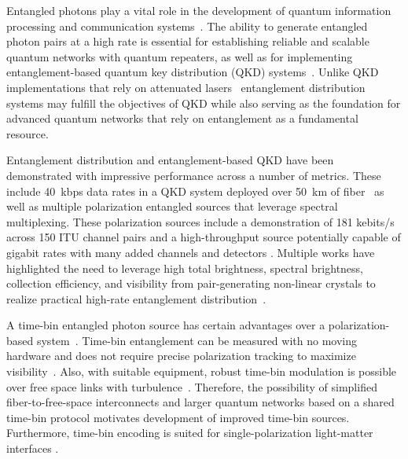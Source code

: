 \documentclass[11pt]{caltech_thesis} %
\begin{document}
Entangled photons play a vital role in the development of quantum information processing and communication systems~\autocite{nielsen2010quantum,ladd2010quantum,gisin2007quantum,pirandola2015advances,briegel1998quantum,kimble2008quantum}. The ability to generate entangled photon pairs at a high rate is essential for establishing reliable and scalable quantum networks with quantum repeaters, as well as for implementing entanglement-based quantum key distribution (QKD) systems~\autocite{Sangouard2011,ma2007quantum,ribordy2000long,yin2017satellite}. Unlike QKD implementations that rely on attenuated lasers~\autocite{sasaki2011field,scarani2009security} entanglement distribution systems may fulfill the objectives of QKD while also serving as the foundation for advanced quantum networks that rely on entanglement as a fundamental resource.

Entanglement distribution and entanglement-based QKD have been demonstrated with impressive performance across a number of metrics. These include 40~kbps data rates in a QKD system deployed over 50~km of fiber~\autocite{Pelet2022} as well as multiple polarization entangled sources that leverage spectral multiplexing. These polarization sources include a demonstration of 181 kebits/s across 150 ITU channel pairs and a high-throughput source potentially capable of gigabit rates with many added channels and detectors \autocite{Alshowkan2022,Neumann2022Entanglement}. Multiple works have highlighted the need to leverage high total brightness, spectral brightness, collection efficiency, and visibility from pair-generating non-linear crystals to realize practical high-rate entanglement distribution~\autocite{Neumann2022Entanglement,atzeni2018integrated,sun2019compact,liu2021device,kaiser2014polarization,anwar2021entangled,neumann2021model}.

A time-bin entangled photon source has certain advantages over a polarization-based system~\autocite{marcikic2002time}. Time-bin entanglement can be measured with no moving hardware and does not require precise polarization tracking to maximize visibility~\autocite{Dong2018PolarizationControll,Fitzke2022TimeBinVsPol}. Also, with suitable equipment, robust time-bin modulation is possible over free space links with turbulence~\autocite{Jin2019}. Therefore, the possibility of simplified fiber-to-free-space interconnects and larger quantum networks based on a shared time-bin protocol motivates development of improved time-bin sources. Furthermore, time-bin encoding is suited for single-polarization light-matter interfaces \autocite[\textcite{lauk2020perspectives}]{simon2010quantum}.
\end{document}
